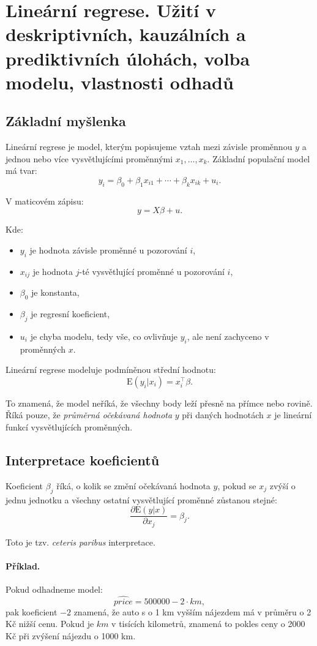 \section{Lineární regrese. Užití v deskriptivních, kauzálních a prediktivních úlohách, volba modelu, vlastnosti odhadů}

\subsection{Základní myšlenka}

Lineární regrese je model, kterým popisujeme vztah mezi závisle proměnnou $y$ a jednou nebo více
vysvětlujícími proměnnými $x_1,\ldots,x_k$. Základní populační model má tvar:
\[
y_i = \beta_0 + \beta_1x_{i1} + \cdots + \beta_kx_{ik} + u_i.
\]

V maticovém zápisu:
\[
y = X\beta + u.
\]

Kde:
\begin{itemize}
    \item $y_i$ je hodnota závisle proměnné u pozorování $i$,
    \item $x_{ij}$ je hodnota $j$-té vysvětlující proměnné u pozorování $i$,
    \item $\beta_0$ je konstanta,
    \item $\beta_j$ je regresní koeficient,
    \item $u_i$ je chyba modelu, tedy vše, co ovlivňuje $y_i$, ale není zachyceno v proměnných $x$.
\end{itemize}

Lineární regrese modeluje podmíněnou střední hodnotu:
\[
\mathrm{E}(y_i|x_i)=x_i^\top\beta.
\]

To znamená, že model neříká, že všechny body leží přesně na přímce nebo rovině. Říká pouze, že
\emph{průměrná očekávaná hodnota} $y$ při daných hodnotách $x$ je lineární funkcí vysvětlujících proměnných.

\subsection{Interpretace koeficientů}

Koeficient $\beta_j$ říká, o kolik se změní očekávaná hodnota $y$, pokud se $x_j$ zvýší o jednu jednotku
a všechny ostatní vysvětlující proměnné zůstanou stejné:
\[
\frac{\partial \mathrm{E}(y|x)}{\partial x_j}=\beta_j.
\]

Toto je tzv. \textit{ceteris paribus} interpretace.

\paragraph{Příklad.}
Pokud odhadneme model:
\[
\widehat{price} = 500000 - 2 \cdot km,
\]
pak koeficient $-2$ znamená, že auto s o 1 km vyšším nájezdem má v průměru o 2 Kč nižší cenu.
Pokud je $km$ v tisících kilometrů, znamená to pokles ceny o 2000 Kč při zvýšení nájezdu o 1000 km.

